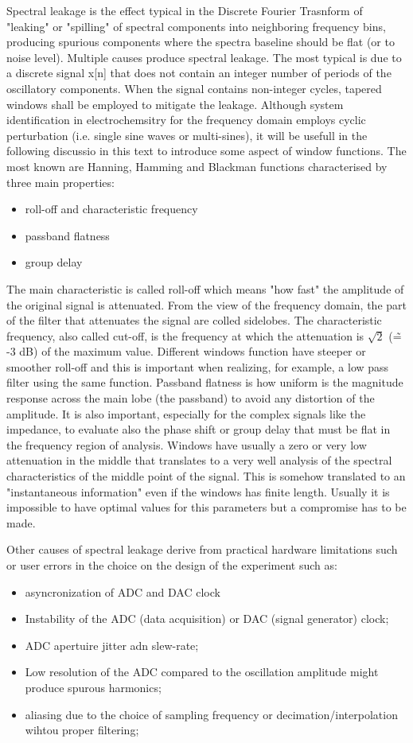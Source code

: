 Spectral leakage is the effect typical in the Discrete Fourier Trasnform of "leaking" or "spilling" of spectral components into neighboring frequency bins, producing spurious components where the spectra baseline should be flat (or to noise level). Multiple causes produce spectral leakage. The most typical is due to a discrete signal x[n] that does not contain an integer number of periods of the oscillatory components. When the signal contains non-integer cycles, tapered windows shall be employed to mitigate the leakage. Although system identification in electrochemsitry for the frequency domain employs cyclic perturbation (i.e. single sine waves or multi-sines), it will be usefull in the following discussio in this text to introduce some aspect of window functions. The most known are Hanning, Hamming and Blackman  functions characterised by three main properties:
\begin{itemize}
    \item roll-off and characteristic frequency
    \item passband flatness
    \item group delay
\end{itemize}
The main characteristic is called roll-off which means "how fast" the amplitude of the original signal is attenuated. From the view of the frequency domain, the part of the filter that attenuates the signal are colled sidelobes. The characteristic frequency, also called cut-off, is the frequency at which the attenuation is $\sqrt{2}$ (\~= -3 dB) of the maximum value. Different windows function have steeper or smoother roll-off and this is important when realizing, for example, a low pass filter using the same function. Passband flatness is how uniform is the magnitude response across the main lobe (the passband) to avoid any distortion of the amplitude.
It is also important, especially for the complex signals like the impedance, to evaluate also the phase shift or group delay that must be flat in the frequency region of analysis. Windows have usually a zero or very low attenuation in the middle that translates to a very well analysis of the spectral characteristics of the middle point of the signal. This is somehow translated to an "instantaneous information" even if the windows has finite length.
Usually it is impossible to have optimal values for this parameters but a compromise has to be made.

Other causes of spectral leakage derive from practical hardware limitations such or user errors in the choice on the design of the experiment such as:
\begin{itemize}
    \item asyncronization of ADC and DAC clock
    \item Instability of the ADC (data acquisition) or DAC (signal generator) clock;
    \item ADC apertuire jitter adn slew-rate;
    \item Low resolution of the ADC compared to the oscillation amplitude might produce spurous harmonics;
    \item aliasing due to the choice of sampling frequency or decimation/interpolation wihtou proper filtering;
\end{itemize}

